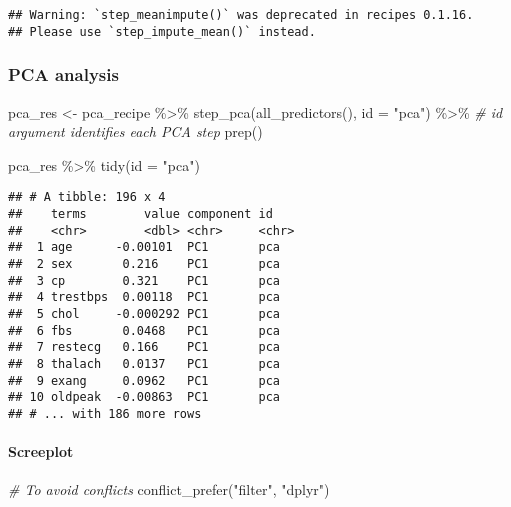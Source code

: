 \documentclass[
]{book}
\newenvironment{Shaded}{\begin{snugshade}}{\end{snugshade}}
\newcommand{\AttributeTok}[1]{\textcolor[rgb]{0.77,0.63,0.00}{#1}}
\newcommand{\CommentTok}[1]{\textcolor[rgb]{0.56,0.35,0.01}{\textit{#1}}}
\newcommand{\FunctionTok}[1]{\textcolor[rgb]{0.00,0.00,0.00}{#1}}
\newcommand{\NormalTok}[1]{#1}
\newcommand{\OtherTok}[1]{\textcolor[rgb]{0.56,0.35,0.01}{#1}}
\newcommand{\SpecialCharTok}[1]{\textcolor[rgb]{0.00,0.00,0.00}{#1}}
\newcommand{\StringTok}[1]{\textcolor[rgb]{0.31,0.60,0.02}{#1}}
\begin{document}
\begin{verbatim}
## Warning: `step_meanimpute()` was deprecated in recipes 0.1.16.
## Please use `step_impute_mean()` instead.
\end{verbatim}

\hypertarget{pca-analysis}{%
\subsubsection{PCA analysis}\label{pca-analysis}}

\begin{Shaded}
\begin{Highlighting}[]
\NormalTok{pca\_res }\OtherTok{\textless{}{-}}\NormalTok{ pca\_recipe }\SpecialCharTok{\%\textgreater{}\%} 
  \FunctionTok{step\_pca}\NormalTok{(}\FunctionTok{all\_predictors}\NormalTok{(), }
           \AttributeTok{id =} \StringTok{"pca"}\NormalTok{) }\SpecialCharTok{\%\textgreater{}\%} \CommentTok{\# id argument identifies each PCA step }
  \FunctionTok{prep}\NormalTok{()}

\NormalTok{pca\_res }\SpecialCharTok{\%\textgreater{}\%}
  \FunctionTok{tidy}\NormalTok{(}\AttributeTok{id =} \StringTok{"pca"}\NormalTok{) }
\end{Highlighting}
\end{Shaded}

\begin{verbatim}
## # A tibble: 196 x 4
##    terms        value component id   
##    <chr>        <dbl> <chr>     <chr>
##  1 age      -0.00101  PC1       pca  
##  2 sex       0.216    PC1       pca  
##  3 cp        0.321    PC1       pca  
##  4 trestbps  0.00118  PC1       pca  
##  5 chol     -0.000292 PC1       pca  
##  6 fbs       0.0468   PC1       pca  
##  7 restecg   0.166    PC1       pca  
##  8 thalach   0.0137   PC1       pca  
##  9 exang     0.0962   PC1       pca  
## 10 oldpeak  -0.00863  PC1       pca  
## # ... with 186 more rows
\end{verbatim}

\hypertarget{screeplot}{%
\paragraph{Screeplot}\label{screeplot}}

\begin{Shaded}
\begin{Highlighting}[]
\CommentTok{\# To avoid conflicts }
\FunctionTok{conflict\_prefer}\NormalTok{(}\StringTok{"filter"}\NormalTok{, }\StringTok{"dplyr"}\NormalTok{) }
\end{Highlighting}
\end{Shaded}
\end{document}
